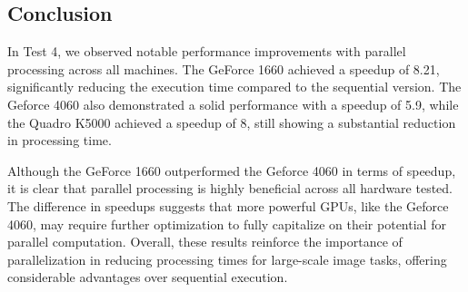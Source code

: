 \subsection{Conclusion}
In Test 4, we observed notable performance improvements with parallel processing across all machines. The GeForce 1660 achieved a speedup of 8.21, significantly reducing the execution time compared to the sequential version. The Geforce 4060 also demonstrated a solid performance with a speedup of 5.9, while the Quadro K5000 achieved a speedup of 8, still showing a substantial reduction in processing time.

Although the GeForce 1660 outperformed the Geforce 4060 in terms of speedup, it is clear that parallel processing is highly beneficial across all hardware tested. The difference in speedups suggests that more powerful GPUs, like the Geforce 4060, may require further optimization to fully capitalize on their potential for parallel computation. Overall, these results reinforce the importance of parallelization in reducing processing times for large-scale image tasks, offering considerable advantages over sequential execution.


